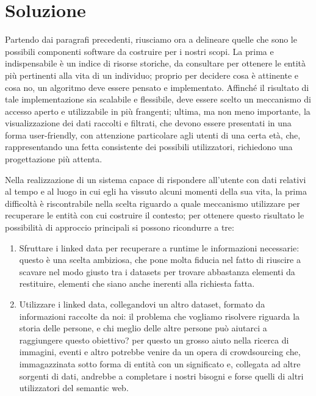 \documentclass[sigproc-sp.tex]{subfiles}
\begin{document}
\section{Soluzione}
Partendo dai paragrafi precedenti, riusciamo ora a delineare quelle che sono le possibili componenti software da costruire per i nostri scopi. La prima e indispensabile è un indice di risorse storiche, da consultare per ottenere le entità più pertinenti alla vita di un individuo; proprio per decidere cosa è attinente e cosa no, un algoritmo deve essere pensato e implementato. Affinché il risultato di tale implementazione sia scalabile e flessibile, deve essere scelto un meccanismo di accesso aperto e utilizzabile in più frangenti; ultima, ma non meno importante, la visualizzazione dei dati raccolti e filtrati, che devono essere presentati in una forma user-friendly, con attenzione particolare agli utenti di una certa età, che, rappresentando una fetta consistente dei possibili utilizzatori, richiedono una progettazione più attenta.

Nella realizzazione di un sistema capace di rispondere all’utente con dati relativi al tempo e al luogo in cui egli ha vissuto alcuni momenti della sua vita, la prima difficoltà è riscontrabile nella scelta riguardo a quale meccanismo utilizzare per recuperare le entità con cui costruire il contesto; per ottenere questo risultato le possibilità di approccio principali si possono ricondurre a tre:

\begin{enumerate}
\item Sfruttare i linked data per recuperare a runtime le informazioni necessarie: questo è una scelta ambiziosa, che pone molta fiducia nel fatto di riuscire a scavare nel modo giusto tra i datasets per trovare abbastanza elementi da restituire, elementi che siano anche inerenti alla richiesta fatta.
\item Utilizzare i linked data, collegandovi un altro dataset, formato da informazioni raccolte da noi: il problema che vogliamo risolvere riguarda la storia delle persone, e chi meglio delle altre persone può aiutarci a raggiungere questo obiettivo? per questo un grosso aiuto nella ricerca di immagini, eventi e altro potrebbe venire da un opera di crowdsourcing che, immagazzinata sotto forma di entità con un significato e, collegata ad altre sorgenti di dati, andrebbe a completare i nostri bisogni e forse quelli di altri utilizzatori del semantic web.
\end{enumerate}
\end{document}
